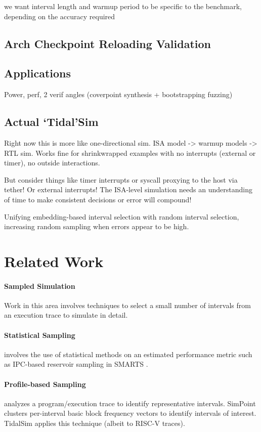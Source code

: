 \documentclass[sigplan,nonacm,10pt]{acmart}
\begin{document}
we want interval length and warmup period to be specific to the benchmark, depending on the accuracy required

\subsection{Arch Checkpoint Reloading Validation}

\subsection{Applications}

Power, perf, 2 verif angles (coverpoint synthesis + bootstrapping fuzzing)

\subsection{Actual `Tidal'Sim}

Right now this is more like one-directional sim. ISA model -> warmup models -> RTL sim.
Works fine for shrinkwrapped examples with no interrupts (external or timer), no outside interactions.

But consider things like timer interrupts or syscall proxying to the host via tether! Or external interrupts!
The ISA-level simulation needs an understanding of time to make consistent decisions or error will compound!

Unifying embedding-based interval selection with random interval selection, increasing random sampling when errors appear to be high.

\section{Related Work}

\paragraph{Sampled Simulation} Work in this area involves techniques to select a small number of intervals from an execution trace to simulate in detail.

\paragraph{Statistical Sampling} involves the use of statistical methods on an estimated performance metric such as IPC-based reservoir sampling in SMARTS \cite{smarts}.

\paragraph{Profile-based Sampling} analyzes a program/execution trace to identify representative intervals. SimPoint \cite{simpoint3} clusters per-interval basic block frequency vectors to identify intervals of interest. TidalSim applies this technique (albeit to RISC-V traces).
\end{document}

